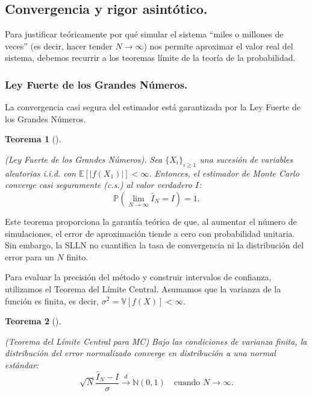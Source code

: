\documentclass[
  spanish,
  us-letterpaper,
]{scrreprt}
\theoremstyle{plain}
\newtheorem{theorem}{Teorema}[chapter]
\theoremstyle{plain}
\theoremstyle{definition}
\theoremstyle{remark}
\begin{document}
\subsection{Convergencia y rigor
asintótico.}\label{convergencia-y-rigor-asintuxf3tico.}

Para justificar teóricamente por qué simular el sistema ``miles o
millones de veces'' (es decir, hacer tender \(N \to \infty\)) nos
permite aproximar el valor real del sistema, debemos recurrir a los
teoremas límite de la teoría de la probabilidad.

\subsubsection{Ley Fuerte de los Grandes
Números.}\label{ley-fuerte-de-los-grandes-nuxfameros.}

La convergencia casi segura del estimador está garantizada por la Ley
Fuerte de los Grandes Números.

\begin{theorem}[]\protect\hypertarget{thm-ley_fuerte_grandes_numeros}{}\label{thm-ley_fuerte_grandes_numeros}

(Ley Fuerte de los Grandes Números). Sea \(\{X_i\}_{i \geq 1}\) una
sucesión de variables aleatorias i.i.d. con
\(\mathbb{E}[|f(X_1)|] < \infty\). Entonces, el estimador de Monte Carlo
converge casi seguramente (c.s.) al valor verdadero \(I\):
\[\mathbb{P}\left( \lim_{N \to \infty} \hat{I}_N = I \right) = 1.\]

\end{theorem}

Este teorema proporciona la garantía teórica de que, al aumentar el
número de simulaciones, el error de aproximación tiende a cero con
probabilidad unitaria. Sin embargo, la SLLN no cuantifica la tasa de
convergencia ni la distribución del error para un \(N\) finito.

Para evaluar la precisión del método y construir intervalos de
confianza, utilizamos el Teorema del Límite Central. Asumamos que la
varianza de la función es finita, es decir,
\(\sigma^2 = \mathbb{V}[f(X)] < \infty\).

\begin{theorem}[]\protect\hypertarget{thm-limite_central}{}\label{thm-limite_central}

(Teorema del Límite Central para MC) Bajo las condiciones de varianza
finita, la distribución del error normalizado converge en distribución a
una normal estándar:
\[    \sqrt{N} \frac{\hat{I}_N - I}{\sigma} \xrightarrow{d} \mathbb{N}(0, 1) \quad \text{cuando } N \to \infty.\]

\end{theorem}
\end{document}
